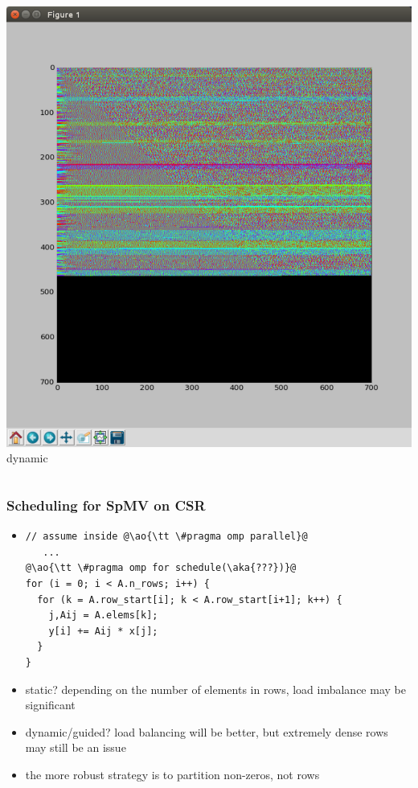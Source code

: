 \documentclass[12pt,dvipdfmx]{beamer}
\newcommand{\ao}[1]{{\color{blue}#1}}
\newcommand{\aka}[1]{{\color{red}#1}}
\begin{document}
\begin{frame}
\begin{columns}
\begin{column}{0.5\textwidth}
\includegraphics[width=\textwidth]{out/pdf/img/load_balance_dynamic.pdf}
\vskip-2mm
{\footnotesize dynamic}
\end{column}
\end{columns}
\end{frame}

\begin{frame}[fragile]
  \frametitle{Scheduling for SpMV on CSR}
  \begin{itemize}
  \item []
\begin{lstlisting}
// assume inside @\ao{\tt \#pragma omp parallel}@
   ...
@\ao{\tt \#pragma omp for schedule(\aka{???})}@
for (i = 0; i < A.n_rows; i++) {
  for (k = A.row_start[i]; k < A.row_start[i+1]; k++) {
    j,Aij = A.elems[k];
    y[i] += Aij * x[j];
  }
}
\end{lstlisting}
\item \ao{static?} depending on the number of elements in rows,
    load imbalance may be significant
 \item \ao{dynamic/guided?} load balancing will be better,
    but extremely dense rows may still be an issue
\item the more robust strategy is to partition non-zeros, not rows
  \end{itemize}
\end{frame}
\end{document}
